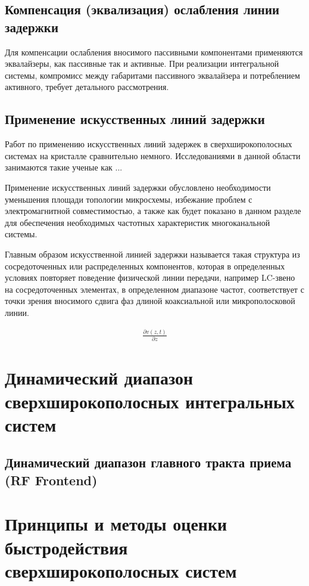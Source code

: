 \subsection{Компенсация (эквализация) ослабления линии задержки}
Для компенсации ослабления вносимого пассивными компонентами применяются эквалайзеры, как пассивные так и активные. При реализации интегральной системы, компромисс между габаритами пассивного эквалайзера и потреблением активного, требует детального рассмотрения.

\subsection{Применение искусственных линий задержки}
Работ по применению искусственных линий задержек в сверхширокополосных системах на кристалле сравнительно немного. Исследованиями в данной области занимаются такие ученые как ...

Применение искусственных линий задержки обусловлено необходимости уменьшения площади топологии микросхемы, избежание проблем с электромагнитной совместимостью, а также как будет показано в данном разделе для обеспечения необходимых частотных характеристик многоканальной системы.

Главным образом искусственной линией задержки называется такая структура из сосредоточенных или распределенных компонентов, которая в определенных условиях повторяет поведение физической линии передачи, например LC-звено на сосредоточенных элементах, в определенном диапазоне частот, соответствует с точки зрения вносимого сдвига фаз длиной коаксиальной или микрополосковой линии.

\begin{equation*}
	\begin{aligned}
		\frac{\partial v(z,t)}{\partial z}
	\end{aligned}
\end{equation*}

\section{Динамический диапазон сверхширокополосных интегральных систем}

\subsection{Динамический диапазон главного тракта приема (RF Frontend)}


\section{Принципы и методы оценки быстродействия сверхширокополосных систем}

